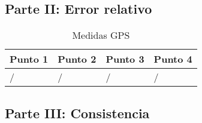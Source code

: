 \documentclass[spanish,12pt,a4paper,titlepage]{report}
\begin{document}
\newpage
\subsection{Parte II: Error relativo}

\begin{table}[H]
\begin{center}
\begin{tabular}{|p{100pt}|p{100pt}|p{100pt}|p{100pt}|} \hline
\cellcolor[gray]{0.8} \textbf{Punto 1} & \cellcolor[gray]{0.8} \textbf{Punto 2} & \cellcolor[gray]{0.8} \textbf{Punto 3} & \cellcolor[gray]{0.8} \textbf{Punto 4} \\ \hline \hline
\hspace{50pt}/ & \hspace{50pt}/ & \hspace{50pt}/ & \hspace{50pt}/ \\ \hline 
\end{tabular} 
\caption{Medidas GPS}
\label{tab:I-medidas}
\end{center}
\end{table}

\newpage
\subsection{Parte III: Consistencia}
\end{document}
